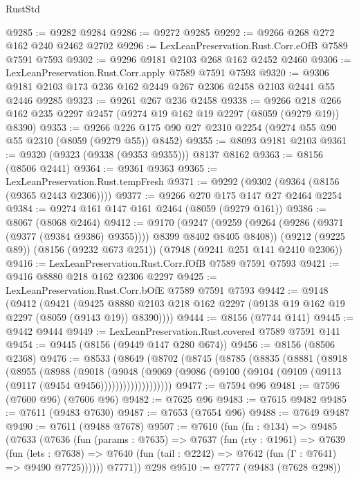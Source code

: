 \begin{lexlean}{RustStd}
\begin{coremodule}
{\begin{coremodule}
{{{{{{{{{{{{{{{{{{{{{{{{{{{{{{{{{{@9285 := @9282 @9284
@9286 := @9272 @9285
@9292 := @9266 @268 @272 @162 @240 @2462 @2702
@9296 := LexLeanPreservation.Rust.Corr.eOfB @7589 @7591 @7593
@9302 := @9296 @9181 @2103 @268 @162 @2452 @2460
@9306 := LexLeanPreservation.Rust.Corr.apply @7589 @7591 @7593
@9320 := @9306 @9181 @2103 @173 @236 @162 @2449 @267 @2306 @2458 @2103 @2441 @55 @2446 @9285
@9323 := @9261 @267 @236 @2458
@9338 := @9266 @218 @266 @162 @235 @2297 @2457 (@9274 @19 @162 @19 @2297 (@8059 (@9279 @19)) @8390)
@9353 := @9266 @226 @175 @90 @27 @2310 @2254 (@9274 @55 @90 @55 @2310 (@8059 (@9279 @55)) @8452)
@9355 := @8093 @9181 @2103
@9361 := @9320 (@9323 (@9338 (@9353 @9355))) @8137 @8162
@9363 := @8156 (@8506 @2441)
@9364 := @9361 @9363
@9365 := LexLeanPreservation.Rust.tempFresh
@9371 := @9292 (@9302 (@9364 (@8156 (@9365 @2443 @2306))))
@9377 := @9266 @270 @175 @147 @27 @2464 @2254
@9384 := @9274 @161 @147 @161 @2464 (@8059 (@9279 @161))
@9386 := @8067 (@8068 @2464)
@9412 := @9170
    (@9247 (@9259 (@9264 (@9286 (@9371 (@9377 (@9384 @9386) @9355)))) @8399 @8402 @8405 @8408))
    (@9212 (@9225 @89))
    (@8156 (@9232 @673 @251))
    (@7948 (@9241 @251 @141 @2410 @2306))
@9416 := LexLeanPreservation.Rust.Corr.fOfB @7589 @7591 @7593
@9421 := @9416 @8880 @218 @162 @2306 @2297
@9425 := LexLeanPreservation.Rust.Corr.bOfE @7589 @7591 @7593
@9442 := @9148
    (@9412
      (@9421
        (@9425 @8880 @2103 @218 @162 @2297 (@9138 @19 @162 @19 @2297 (@8059 (@9143 @19)) @8390))))
@9444 := @8156 (@7744 @141)
@9445 := @9442 @9444
@9449 := LexLeanPreservation.Rust.covered @7589 @7591 @141
@9454 := @9445 (@8156 (@9449 @147 @280 @674))
@9456 := @8156 (@8506 @2368)
@9476 := @8533
    (@8649
      (@8702
        (@8745
          (@8785
            (@8835
              (@8881
                (@8918
                  (@8955
                    (@8988
                      (@9018
                        (@9048
                          (@9069
                            (@9086
                              (@9100 (@9104 (@9109 (@9113 (@9117 (@9454 @9456)))))))))))))))))))
@9477 := @7594 @96
@9481 := @7596 (@7600 @96) (@7606 @96)
@9482 := @7625 @96
@9483 := @7615 @9482
@9485 := @7611 (@9483 @7630)
@9487 := @7653 (@7654 @96)
@9488 := @7649 @9487
@9490 := @7611 (@9488 @7678)
@9507 := @7610
    (fun (fn : @134) =>
    @9485
      (@7633
        (@7636
          (fun (params : @7635) =>
          @7637
            (fun (rty : @1961) =>
            @7639
              (fun (lets : @7638) =>
              @7640 (fun (tail : @2242) => @7642 (fun (Γ : @7641) => @9490 @7725))))))
        @7771))
    @298
@9510 := @7777 (@9483 (@7628 @298))
}}}}}}}}}}}}}}}}}}}}}}}}}}}}}}}}}}
\end{coremodule}}
\end{coremodule}
\end{lexlean}
